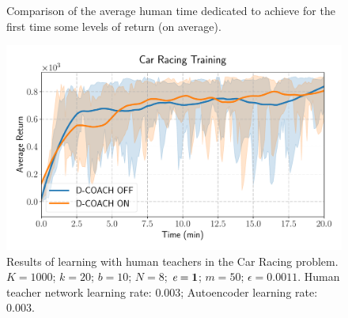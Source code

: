 \begin{figure}[H]
\centering
{}
\caption{Comparison of the average human time dedicated to achieve for the first time some levels of return (on average).} 
\label{fig:stacked_bar} 
\end{figure}

\begin{figure}[H]
    \centering
    \includegraphics[width=0.8\linewidth]{imagenes/cap3/car_racing_human_teacher_ICRA.pdf}
    \caption{Results of learning with human teachers in the Car Racing problem. $K = 1000$; $k=20$; $b = 10$; $N = 8$; $\emph{e}=\textbf{1}$; $m=50$; $\epsilon=0.0011$. Human teacher network learning rate: $0.003$; Autoencoder learning rate: $0.003$.}
    \label{fig:humanteachers1}
\end{figure}

